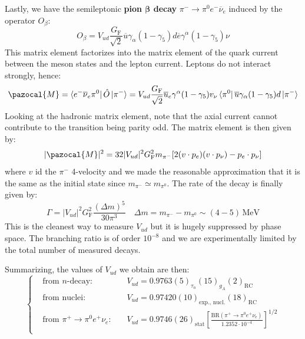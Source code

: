 \documentclass[../main.tex]{subfiles}
\begin{document}
Lastly, we have the semileptonic \textbf{pion $\mathbf{\beta}$ decay}  $\pi^-\to\pi^0e^-\overline{\nu}_e$ induced by the operator $O_\beta$:
\[
O_\beta=V_{ud}\frac{G_{\text{F}}}{\sqrt{2}}\overline{u}\gamma_\alpha(1-\gamma_5)d\overline{e}\gamma^\alpha(1-\gamma_5)\nu
\]
This matrix element factorizes into the matrix element of the quark current between the meson states and the lepton current. Leptons do not interact strongly, hence:
\[
\pazocal{M}=\bra{e^-\overline{\nu}_e\pi^0}\hat{O}\ket{\pi^-}=V_{ud}\frac{G_{\text{F}}}{\sqrt{2}}\overline{u}_e\gamma^\alpha(1-\gamma_5)v_\nu\bra{\pi^0}\overline{u}\gamma_\alpha(1-\gamma_5)d\ket{\pi^-}
\]
Looking at the hadronic matrix element, note that the axial current cannot contribute to the transition being parity odd. The matrix element is then given by:
\[
|\pazocal{M}|^2=32|V_{ud}|^2G_{\text{F}}^2m_{\pi^-}[2(v\cdot p_e)(v\cdot p_\nu)-p_e\cdot p_\nu]
\]
where $v$ id the $\pi^-$ 4-velocity and we made the reasonable approximation that it is the same as the initial state since $m_{\pi^-}\simeq m_{\pi^0}$. The rate of the decay is finally given by:
\[
\Gamma=|V_{ud}|^2G_{\text{F}}^2\frac{(\Delta m)^5}{30\pi^3} \quad \Delta m=m_{\pi^-}-m_{\pi^0}\sim (4-5)\,\text{MeV}
\]
This is the cleanest way to measure $V_{ud}$ but it is hugely suppressed by phase space. The branching ratio is of order $10^{-8}$ and we are experimentally limited by the total number of measured decays.\\
\begin{kaobox}[frametitle=Measuring $V_{ud}$]
Summarizing, the values of $V_{ud}$ we obtain are then:
\[
\left\{
\begin{aligned}
&\text{from $n$-decay: }&&V_{ud}=0.9763(5)_{\tau_n}(15)_{g_A}(2)_{\text{RC}}\\
&\text{from nuclei: }&&V_{ud}=0.97420(10)_{\text{exp., nucl.}}(18)_{\text{RC}}\\
&\text{from $\pi^+\to\pi^0e^+\nu_e$: }&&V_{ud}=0.9746(26)_{\text{stat}}\left[\frac{\text{BR}(\pi^+\to\pi^0e^+\nu_e)}{1.2352\cdot10^{-4}}\right]^{1/2}\\
\end{aligned}
\right.
\]
\end{kaobox}
\end{document}

